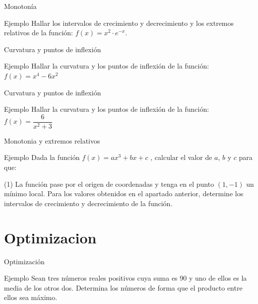 \documentclass[8pt]{beamer}
\begin{document}
\begin{frame}[t]{Monotonía}
\begin{exampleblock}{Ejemplo}
Hallar los intervalos de crecimiento y decrecimiento y los extremos relativos de la función: $f(x)=x^2 \cdot e^{-x}$.
\end{exampleblock}
\end{frame}


\begin{frame}[t]{Curvatura y puntos de inflexión}
\begin{exampleblock}{Ejemplo}
Hallar la curvatura y los puntos de inflexión de la función: $f(x)=x^4-6x^2$
\end{exampleblock}
\end{frame}

\begin{frame}[t]{Curvatura y puntos de inflexión}
\begin{exampleblock}{Ejemplo}
Hallar la curvatura y los puntos de inflexión de la función: $f(x)=\dfrac{6}{x^2+3}$
\end{exampleblock}
\end{frame}

\begin{frame}[t]{Monotonia y extremos relativos}
\begin{exampleblock}{Ejemplo}
Dada la función $f(x)=ax^3+bx+c$ , calcular el valor de $a$, $b$ y $c$ para
que:
\begin{tasks}[label=\alph*)](1)
\task La función pase por el origen de coordenadas y tenga en el punto $(1,-1)$ un mínimo local.
\task Para los valores obtenidos en el apartado anterior, determine los intervalos de crecimiento y decrecimiento de la función.
\end{tasks}
\end{exampleblock}
\end{frame}
\section{Optimizacion}

\begin{frame}[t]{Optimización}
\begin{exampleblock}{Ejemplo}
Sean tres números reales positivos cuya suma es 90 y uno de ellos es la media de los
otros dos. Determina los números de forma que el producto entre ellos sea máximo.
\end{exampleblock}
\pause

\end{frame}
\end{document}
